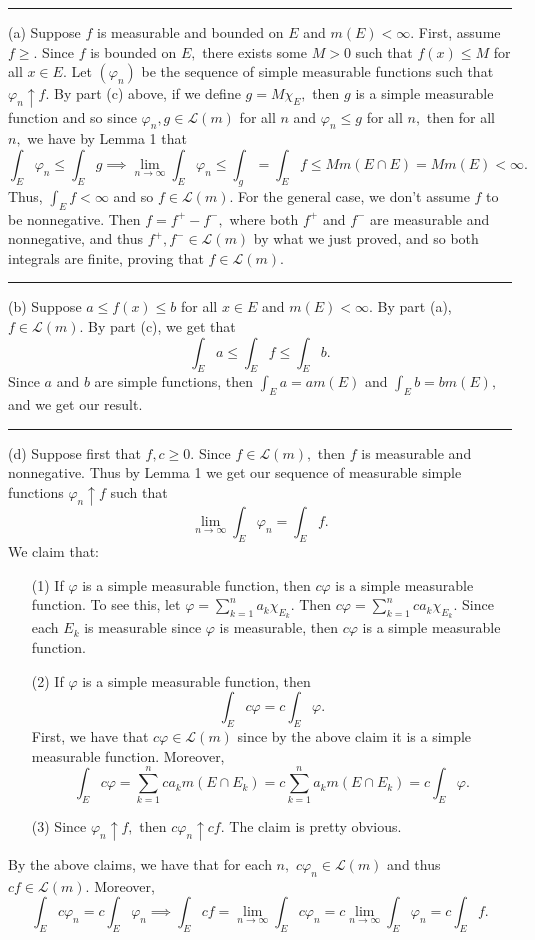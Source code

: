 \documentclass[11pt]{article}
\begin{document}
\begin{solution}
\rule{\linewidth}{0.4pt}

(a) Suppose $f$ is measurable and bounded on $E$ and $m(E) < \infty.$ First, assume $f\geq .$ Since $f$ is bounded on $E,$ there exists some $M >0$ such that $f(x) \leq M$ for all $x\in E.$ Let $(\varphi_n)$ be the sequence of simple measurable functions such that $\varphi_n \uparrow f.$ By part (c) above, if we define $g = M \chi_{E},$ then $g$ is a simple measurable function and so since $ \varphi_n, g \in \mathcal{L}(m)$ for all $n$ and $\varphi_n \leq g$ for all $n,$ then for all $n,$ we have by Lemma 1 that
\[\int_E \varphi_n \leq \int_E g \implies \lim_{n\to \infty}\int_E \varphi_n \leq \int_g = \int_E f \leq M m(E \cap E) = Mm(E) < \infty.\] Thus, $\int_E f < \infty$ and so $f \in \mathcal{L}(m).$ For the general case, we don't assume $f$ to be nonnegative. Then $f = f^+ - f^-,$ where both $f^+$ and $f^-$ are measurable and nonnegative, and thus $f^+, f^- \in \mathcal{L}(m)$ by what we just proved, and so both integrals are finite, proving that $f \in \mathcal{L}(m).$

\rule{\linewidth}{0.4pt}

(b) Suppose $a\leq f(x) \leq b$ for all $x \in E$ and $m(E) < \infty.$ By part (a), $f \in \mathcal{L}(m).$ By part (c), we get that 
\[\int_E a \leq \int_E f \leq \int_E b.\] Since $a$ and $b$ are simple functions, then $\int_E a = a m(E)$ and $\int_E b = bm(E),$ and we get our result.

\rule{\linewidth}{0.4pt}

(d) Suppose first that $f, c \geq 0.$ Since $f \in \mathcal{L}(m),$ then $f$ is measurable and nonnegative. Thus by Lemma 1 we get our sequence of measurable simple functions $\varphi_n \uparrow f$ such that 
\[\lim_{n\to \infty} \int_E \varphi_n = \int_E f.\] We claim that: 
\begin{enumerate}
    \item [(1)] If $\varphi$ is a simple measurable function, then $c \varphi$ is a simple measurable function. To see this, let $\varphi = \sum_{k=1}^n a_k \chi_{E_k}.$ Then $c \varphi = \sum_{k=1}^n ca_k \chi_{E_k}.$ Since each $E_k$ is measurable since $\varphi$ is measurable, then $c\varphi$ is a simple measurable function.
    \item [(2)] If $\varphi$ is a simple measurable function, then 
    \[\int_E c \varphi = c \int_E \varphi.\] First, we have that $c \varphi \in \mathcal{L}(m)$ since by the above claim it is a simple measurable function. Moreover, 
    \[\int_E c\varphi = \sum_{k=1}^n ca_k m(E \cap E_k) = c\sum_{k=1}^n a_k m(E \cap E_k) = c\int_E \varphi.\]
    \item [(3)] Since $\varphi_n \uparrow f,$ then $c\varphi_n \uparrow cf.$ The claim is pretty obvious. 
\end{enumerate}
By the above claims, we have that for each $n,$ $c\varphi_n \in \mathcal{L}(m)$ and thus $cf \in \mathcal{L}(m).$ Moreover,
\[\int_E c\varphi_n = c\int_E \varphi_n \implies \int_E cf  =  \lim_{n\to \infty} \int_E c\varphi_n  = c\lim_{n\to \infty}\int_E \varphi_n  = c\int_E f.\]



\end{solution}
\end{document}
